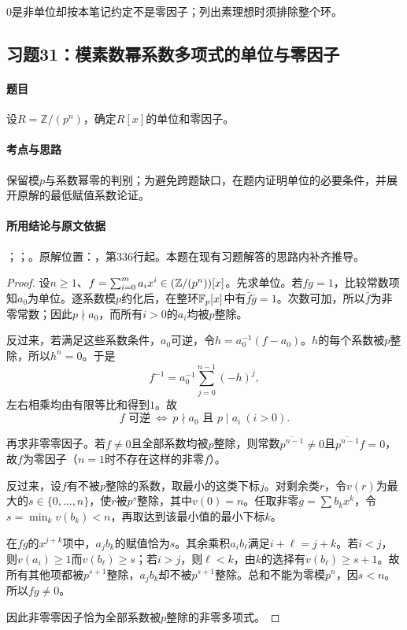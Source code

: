 $0$是非单位却按本笔记约定不是零因子；列出素理想时须排除整个环。



\subsection{习题31：模素数幂系数多项式的单位与零因子}

\label{ex:3:31}

\paragraph{题目}

设$R=\mathbb Z/(p^n)$，确定$R[x]$的单位和零因子。

\paragraph{考点与思路}

保留模$p$与系数幂零的判别；为避免跨题缺口，在题内证明单位的必要条件，并展开原解的最低赋值系数论证。

\paragraph{所用结论与原文依据}

；；。原解位置：，第336行起。本题在现有习题解答的思路内补齐推导。


\begin{proof}

设$n\ge1$、$f=\sum_{i=0}^m a_ix^i\in(\mathbb Z/(p^n))[x]$。先求单位。若$fg=1$，比较常数项知$a_0$为单位。逐系数模$p$约化后，在整环$\mathbb F_p[x]$中有$\bar f\bar g=1$。次数可加，所以$\bar f$为非零常数；因此$p\nmid a_0$，而所有$i>0$的$a_i$均被$p$整除。

反过来，若满足这些系数条件，$a_0$可逆，令$h=a_0^{-1}(f-a_0)$。$h$的每个系数被$p$整除，所以$h^n=0$。于是
\[
f^{-1}=a_0^{-1}\sum_{j=0}^{n-1}(-h)^j,
\]
左右相乘均由有限等比和得到$1$。故
\[
f\text{ 可逆}\ \Longleftrightarrow\ p\nmid a_0\text{ 且 }p\mid a_i\ (i>0).
\]

再求非零零因子。若$f\ne0$且全部系数均被$p$整除，则常数$\overline{p^{n-1}}\ne0$且$\overline{p^{n-1}}f=0$，故$f$为零因子（$n=1$时不存在这样的非零$f$）。

反过来，设$f$有不被$p$整除的系数，取最小的这类下标$j$。对剩余类$r$，令$v(r)$为最大的$s\in\{0,\ldots,n\}$，使$r$被$p^s$整除，其中$v(0)=n$。任取非零$g=\sum b_kx^k$，令$s=\min_kv(b_k)<n$，再取达到该最小值的最小下标$k$。

在$fg$的$x^{j+k}$项中，$a_jb_k$的赋值恰为$s$。其余乘积$a_ib_\ell$满足$i+\ell=j+k$。若$i<j$，则$v(a_i)\ge1$而$v(b_\ell)\ge s$；若$i>j$，则$\ell<k$，由$k$的选择有$v(b_\ell)\ge s+1$。故所有其他项都被$p^{s+1}$整除，$a_jb_k$却不被$p^{s+1}$整除。总和不能为零模$p^n$，因$s<n$。所以$fg\ne0$。

因此非零零因子恰为全部系数被$p$整除的非零多项式。

\end{proof}

